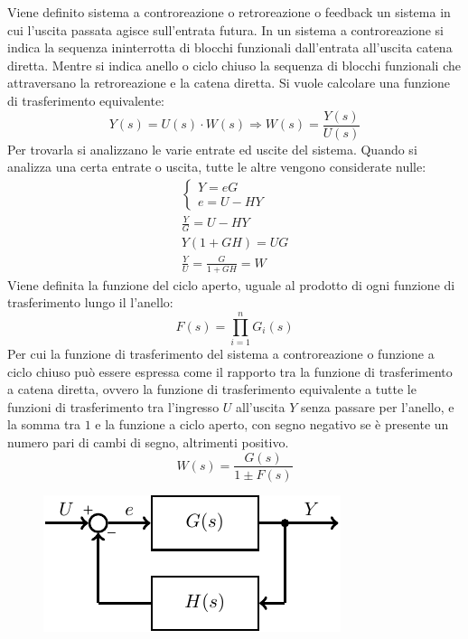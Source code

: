 \documentclass{article}
\numberwithin{equation}{subsection}
\begin{document}
Viene definito sistema a controreazione o retroreazione o feedback un sistema in cui l'uscita passata agisce sull'entrata futura. In un sistema a controreazione si 
indica la sequenza ininterrotta di blocchi funzionali dall'entrata all'uscita catena diretta. Mentre si indica anello o ciclo chiuso la sequenza di 
blocchi funzionali che attraversano la retroreazione e la catena diretta. Si vuole calcolare 
una funzione di trasferimento equivalente:
\begin{equation*}
    Y(s)=U(s)\cdot W(s)\Rightarrow W(s)=\displaystyle\frac{Y(s)}{U(s)}
\end{equation*}    
Per trovarla si analizzano le varie entrate ed uscite del sistema. Quando si analizza una certa 
entrate o uscita, tutte le altre vengono considerate nulle:
\begin{gather*}
    \begin{cases}
        Y=eG\\
        e=U-HY
    \end{cases}\\
    \displaystyle\frac{Y}{G}=U-HY\\
    Y(1+GH)=UG\\
    \displaystyle\frac{Y}{U}=\frac{G}{1+GH}=W
\end{gather*}
Viene definita la funzione del ciclo aperto, uguale al prodotto di ogni funzione di trasferimento lungo il l'anello:
\begin{equation}
    F(s)=\prod_{i=1}^nG_i(s)
\end{equation}
Per cui la funzione di trasferimento del sistema a controreazione o funzione a ciclo chiuso può essere espressa come il rapporto tra la funzione di 
trasferimento a catena diretta, 
ovvero la funzione di trasferimento equivalente a tutte le funzioni di trasferimento tra l'ingresso $U$ all'uscita $Y$ senza passare per l'anello, e la 
somma tra $1$ e la funzione a ciclo aperto, con segno negativo se è presente un numero pari di cambi di segno, altrimenti positivo. 
\begin{equation}
    W(s)=\displaystyle\frac{G(s)}{1\pm F(s)}
\end{equation}

\begin{figure}[H]%
    \centering
    \includegraphics{controreazione-1.pdf}%
\end{figure}
\end{document}
